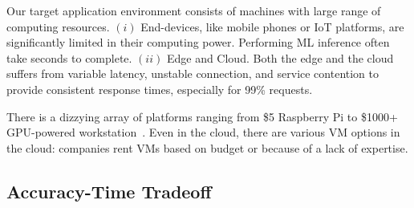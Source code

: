 Our target application environment consists of machines with large range of
computing resources. $(i)$ End-devices, like mobile phones or IoT platforms, are
significantly limited in their computing power. Performing ML inference often
take seconds to complete. $(ii)$ Edge and Cloud. Both the edge and the cloud
suffers from variable latency, unstable connection, and service contention to
provide consistent response times, especially for 99\% requests.

There is a dizzying array of platforms ranging from \$5 Raspberry Pi to \$1000+
GPU-powered workstation~\cite{zhang2015cloud}.  Even in the cloud, there are
various VM options in the cloud: companies rent VMs based on budget or because
of a lack of expertise.

\subsection{Accuracy-Time Tradeoff}
\label{sec:comp-perf-model}

